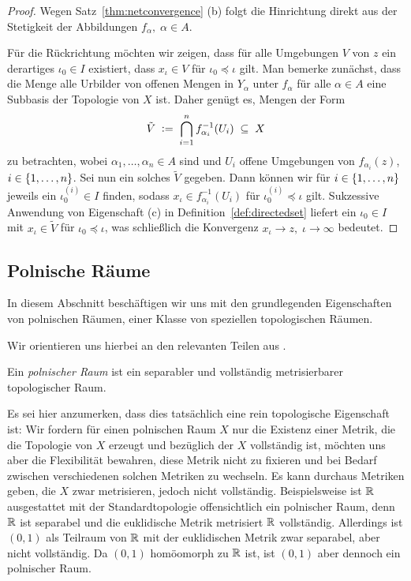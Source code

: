 \documentclass[../main/main.tex]{subfiles}
\begin{document}
	\begin{proof}
		Wegen Satz~\ref{thm:netconvergence} (b) folgt die Hinrichtung direkt aus der Stetigkeit der Abbildungen $f_\alpha, \; \alpha \in A$.
		
		Für die Rückrichtung möchten wir zeigen, dass für alle Umgebungen $V$ von $z$ ein derartiges $\iota_0 \in I$ existiert, dass $x_\iota \in V$ für $\iota_0 \preceq \iota$ gilt.
		Man bemerke zunächst, dass die Menge alle Urbilder von offenen Mengen in $Y_\alpha$ unter $f_\alpha$ für alle $\alpha \in A$ eine Subbasis der Topologie von $X$ ist.
		Daher genügt es, Mengen der Form
		\[ \tilde{V} \; \vcentcolon = \; \bigcap_{i=1}^{n} f_{\alpha_i}^{-1}(U_i) \; \subseteq \; X \]
		zu betrachten, wobei $\alpha_1, \dots, \alpha_n \in A$ sind und $U_i$ offene Umgebungen von $f_{\alpha_i}(z)$, $i \in \left\{1, \dots, n\right\}$.
		Sei nun ein solches $\tilde{V}$ gegeben. Dann können wir für $i \in \left\{1, \dots, n\right\}$ jeweils ein $\iota_0^{(i)} \in I$ finden, sodass $x_\iota \in f_{\alpha_i}^{-1}(U_i)$ für 
		$\iota_0^{(i)} \preceq \iota$ gilt. Sukzessive Anwendung von Eigenschaft (c) in Definition~\ref{def:directedset} liefert ein $\iota_0 \in I$ mit 
		$x_\iota \in \tilde{V}$ für $\iota_0 \preceq \iota$, was schließlich die Konvergenz $x_\iota \to z, \; \iota \to \infty$ bedeutet.
	\end{proof}
	
	\subsection{Polnische Räume}
	
	In diesem Abschnitt beschäftigen wir uns mit den grundlegenden Eigenschaften von polnischen Räumen, 
	einer Klasse von speziellen topologischen Räumen. 
	
	Wir orientieren uns hierbei an den relevanten Teilen aus \cite[Kapitel 4.14]{Simon.2015}.
	
	\begin{Definition}
		Ein \emph{polnischer Raum} ist ein separabler und vollständig metrisierbarer topologischer Raum.
	\end{Definition}
	
	Es sei hier anzumerken, dass dies tatsächlich eine rein topologische Eigenschaft ist: Wir fordern für einen polnischen Raum $X$ nur die Existenz einer Metrik,
	die die Topologie von $X$ erzeugt und bezüglich der $X$ vollständig ist, möchten uns aber die Flexibilität
	bewahren, diese Metrik nicht zu fixieren und bei Bedarf zwischen verschiedenen solchen Metriken
	zu wechseln. Es kann durchaus Metriken geben, die $X$ zwar metrisieren, jedoch nicht vollständig.
	Beispielsweise ist $\mathbb{R}$ ausgestattet mit der Standardtopologie offensichtlich ein polnischer Raum,
	denn $\mathbb{R}$ ist separabel und die euklidische Metrik metrisiert $\mathbb{R}$ vollständig. 
	Allerdings ist $(0, 1)$ als Teilraum von $\mathbb{R}$ mit der euklidischen Metrik zwar separabel, aber nicht vollständig.
	Da $(0, 1)$ homöomorph zu $\mathbb{R}$ ist, ist $(0, 1)$ aber dennoch ein polnischer Raum.
	
\end{document}
